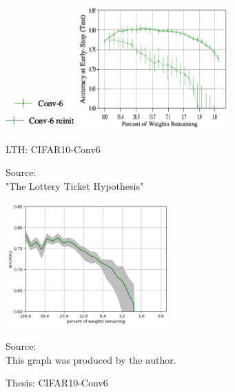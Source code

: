 \begin{figure}
	\begin{minipage}{\textwidth}
		\centering
		\includegraphics[width=100px]{gfx/7-Evaluation/LTH_4_legend.png}
	\end{minipage}
	\begin{minipage}{0.5\textwidth}
		\centering
		\includegraphics[height=180px]{gfx/7-Evaluation/LTH_CNN_clean.png}
		\caption{LTH: CIFAR10-Conv6}
		\vspace{7pt}
		\footnotesize{
			Source:\\
			"The Lottery Ticket Hypothesis" \cite{LTH}
		}
		\label{fig:CIFAR10-Conv6-LTH}
	\end{minipage}\hfill
	\begin{minipage}{0.5\textwidth}
		\centering
		\includegraphics[height=180px]{gfx/Experiments/Reproduction-CIFAR10-CNN/accuracy/LTH.png}
		\caption{Thesis: CIFAR10-Conv6}
		\vspace{7pt}
		\footnotesize{
			Source:\\
			This graph was produced by the author.
		}
		\label{fig:CIFAR10-Conv6-Thesis}
	\end{minipage}
\end{figure}

